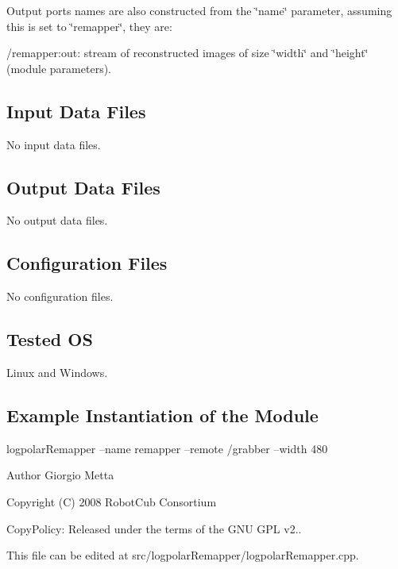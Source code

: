 Output ports names are also constructed from the \char`\"{}name\char`\"{} parameter, assuming this is set to \char`\"{}remapper\char`\"{}, they are\+:
\begin{DoxyItemize}
\item /remapper\+:out\+: stream of reconstructed images of size \char`\"{}width\char`\"{} and \char`\"{}height\char`\"{} (module parameters).
\end{DoxyItemize}\hypertarget{group__icub__logpolarTransform_in_files_sec}{}\subsection{Input Data Files}\label{group__icub__logpolarTransform_in_files_sec}
No input data files.\hypertarget{group__icub__logpolarTransform_out_data_sec}{}\subsection{Output Data Files}\label{group__icub__logpolarTransform_out_data_sec}
No output data files.\hypertarget{group__icub__logpolarTransform_conf_file_sec}{}\subsection{Configuration Files}\label{group__icub__logpolarTransform_conf_file_sec}
No configuration files.\hypertarget{group__icub__logpolarTransform_tested_os_sec}{}\subsection{Tested O\+S}\label{group__icub__logpolarTransform_tested_os_sec}
Linux and Windows.\hypertarget{group__icub__logpolarTransform_example_sec}{}\subsection{Example Instantiation of the Module}\label{group__icub__logpolarTransform_example_sec}
logpolar\+Remapper --name remapper --remote /grabber --width 480

\begin{DoxyAuthor}{Author}
Giorgio Metta
\end{DoxyAuthor}
Copyright (C) 2008 Robot\+Cub Consortium

Copy\+Policy\+: Released under the terms of the G\+N\+U G\+P\+L v2..

This file can be edited at src/logpolar\+Remapper/logpolar\+Remapper.\+cpp. 